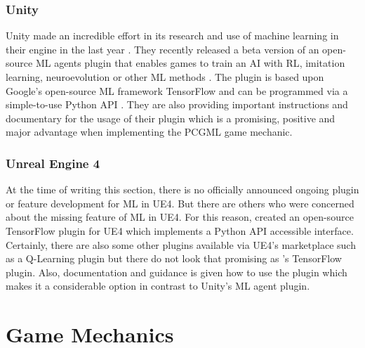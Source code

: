 \documentclass[MGS,Master,english]{twbook}%
\begin{document}
\subsubsection{Unity}
Unity made an incredible effort in its research and use of machine learning in their engine in the last year \cite{unity::ml}. They recently released a beta version of an open-source ML agents plugin that enables games to train an AI with \ac{RL}, imitation learning, neuroevolution or other ML methods \cite{unity::mlGithub}. The plugin is based upon Google's open-source ML framework TensorFlow \cite{api::tensorFlow} and can be programmed via a simple-to-use Python \ac{API} \cite{unity::mlGithub}. They are also providing important instructions and documentary for the usage of their plugin which is a promising, positive and major advantage when implementing the PCGML game mechanic.

\subsubsection{Unreal Engine 4}
At the time of writing this section, there is no officially announced ongoing plugin or feature development for ML in \ac{UE4}. But there are others who were concerned about the missing feature of ML in UE4. For this reason, \cite{ue4::tensorFlowPlugin} created an open-source TensorFlow plugin for UE4 which implements a Python API accessible interface. Certainly, there are also some other plugins available via UE4's marketplace such as a Q-Learning plugin but there do not look that promising as \cite{ue4::tensorFlowPlugin}'s TensorFlow plugin. Also, documentation and guidance is given how to use the plugin which makes it a considerable option in contrast to Unity's ML agent plugin.

\section{Game Mechanics}
\end{document}
